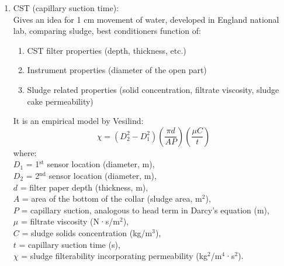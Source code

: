 \documentclass{article}
\numberwithin{equation}{section}
\begin{document}
\begin{enumerate} [start=5]
\begin{enumerate}
    Rearranging the formula:
    \begin{equation}
        Q_F = \frac{Q_0(C_0-C_K)}{C_F-C_K} \label{eq:w_2}
    \end{equation}
    For $w$, if the filtrate SS can be assumed negligible (which is reasonable), i.e., $C_F$ = 0, and as Equation \ref{eq:w_2} is substituted into Equation \ref{eq:w_1}, then:
    \[
    w = \frac{C_KC_0}{(C_K-C_0)}
    \]
    If in \%:
    \[
    w = \frac{C_KC_0}{100(C_K-C_0)}
    \]
    where:\\
    $C_K$ = cake solids concentration (\%),\\
    $C_0$ = feed solids concentration (\%).\\
    A new test is developed, which is CST (capillary suction time).
    \item CST (capillary suction time):\\
    Gives an idea for 1 cm movement of water, developed in England national lab, comparing sludge, best conditioners function of:
    \begin{enumerate}
        \item CST filter properties (depth, thickness, etc.)
        \item Instrument properties (diameter of the open part)
        \item Sludge related properties (solid concentration, filtrate viscosity, sludge cake permeability)
    \end{enumerate}
    It is an empirical model by Vesilind:
    \[
    \chi = (D_2^2 - D_1^2)\left(\frac{\pi d}{ A P }\right)\left(\frac{\mu C}{t}\right)
    \]
    where:\\
    $D_1$ = 1$^\text{st}$ sensor location (diameter, m),\\
    $D_2$ = 2$^\text{nd}$ sensor location (diameter, m),\\
    $d$ = filter paper depth (thickness, m),\\
    $A$ = area of the bottom of the collar (sludge area, m$^2$),\\
    $P$ = capillary suction, analogous to head term in Darcy's equation (m),\\
    $\mu$ = filtrate viscosity (N·s/m$^2$),\\
    $C$ = sludge solids concentration (kg/m$^3$),\\
    $t$ = capillary suction time (s),\\
    $\chi$ = sludge filterability incorporating permeability (kg$^2$/m$^4$·s$^2$).
    \begin{itemize}

\end{itemize}
\end{enumerate}
\end{enumerate}
\end{document}
